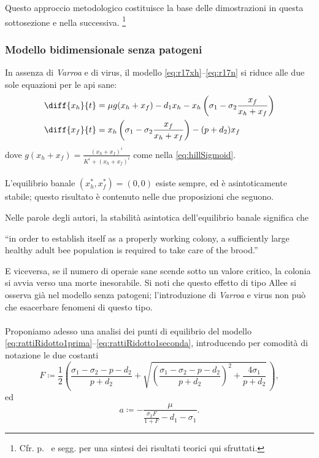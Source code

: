 Questo approccio metodologico costituisce la base delle dimostrazioni in questa sottosezione e nella successiva.
\footnote{Cfr. p.~\pageref{chap:teoria} e segg. per una sintesi dei risultati teorici qui sfruttati.}

\subsubsection{Modello bidimensionale senza patogeni}
In assenza di \emph{Varroa} e di virus, il modello \eqref{eq:r17xh}--\eqref{eq:r17n} si riduce alle due sole equazioni per le api sane:
\begin{align}
    \diff{x_h}{t} &= \mu g( x_h + x_f ) - d_1 x_h - x_h \left( \sigma_1 - \sigma_2 \frac{x_f}{x_h + x_f} \right)
    \label{eq:rattiRidotto1prima}
    \\
    \diff{x_f}{t} &= x_h \left( \sigma_1 - \sigma_2 \frac{x_f}{x_h + x_f} \right) - (p + d_2) x_f
    \label{eq:rattiRidotto1seconda}
\end{align}
dove $g(x_h + x_f) = \frac{ (x_h+x_f)^i }{ K^i + (x_h+x_f)^i }$ come nella \eqref{eq:hillSigmoid}.

\paragraph{}
L'equilibrio banale $(x_h^*, x_f^*) = (0,0)$ esiste sempre, ed è asintoticamente stabile; questo risultato è contenuto nelle due proposizioni che seguono.

Nelle parole degli autori, la stabilità asintotica dell'equilibrio banale significa che
\begin{displayquote}
``\omissis in order to establish itself as a properly working colony, a sufficiently large healthy adult bee population is required to take care of the brood.''
\end{displayquote}

E viceversa, se il numero di operaie sane scende sotto un valore critico, la colonia si avvia verso una morte inesorabile.
Si noti che questo effetto di tipo Allee si osserva già nel modello senza patogeni; l'introduzione di \emph{Varroa} e virus non può che esacerbare fenomeni di questo tipo.

\paragraph{}
Proponiamo adesso una analisi dei punti di equilibrio del modello \eqref{eq:rattiRidotto1prima}--\eqref{eq:rattiRidotto1seconda}, introducendo per comodità di notazione le due costanti
\begin{equation}
    F \coloneq \frac{1}{2} \left( \frac{ \sigma_1 - \sigma_2 - p - d_2 }{p+d_2} +
    \sqrt{ {\left( \frac{ \sigma_1 - \sigma_2 - p - d_2 }{p+d_2} \right)}^2 + \frac{4 \sigma_1}{p+d_2} } \, \right),
    \label{eq:rattiFconst}
\end{equation}
ed
$$ a \coloneq - \frac{ \mu }{ \frac{\sigma_2 F}{1+F} - d_1 - \sigma_1 }.$$

